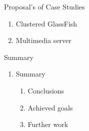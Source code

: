 \documentclass{beamer}
\begin{document}
\begin{frame}{Proposal's of Case Studies}

	\begin{enumerate}
		\setcounter{enumi}{\value{enumi_chapter}}

		\item Clustered GlassFish
		\item Multimedia server

	
	\end{enumerate}

\end{frame}

\setcounter{enumi_chapter}{\value{enumi}}


\begin{frame}{Summary}

	\begin{enumerate}
		\setcounter{enumi}{\value{enumi_chapter}}

		\item Summary

			\begin{enumerate}
				\item Conclusions
				\item Achieved goals
				\item Further work
			\end{enumerate}

	\end{enumerate}

\end{frame}

\setcounter{enumi_chapter}{\value{enumi}}
\end{document}
